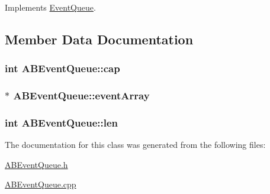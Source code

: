 Implements \hyperlink{class_event_queue_a4f49434cc8ca60030f2b5737399527e2}{Event\+Queue}.



\subsection{Member Data Documentation}
\subsubsection[{\texorpdfstring{cap}{cap}}]{\setlength{\rightskip}{0pt plus 5cm}int A\+B\+Event\+Queue\+::cap\hspace{0.3cm}{\ttfamily [private]}}\hypertarget{class_a_b_event_queue_a3f8d4bf9c3dad9b88a9f99220b567ed6}{}\label{class_a_b_event_queue_a3f8d4bf9c3dad9b88a9f99220b567ed6}
\subsubsection[{\texorpdfstring{event\+Array}{eventArray}}]{$\ast$ A\+B\+Event\+Queue\+::event\+Array\hspace{0.3cm}{\ttfamily [private]}}\hypertarget{class_a_b_event_queue_acb0bc62d6a21b4633ba50ae83fd4d79e}{}\label{class_a_b_event_queue_acb0bc62d6a21b4633ba50ae83fd4d79e}
\subsubsection[{\texorpdfstring{len}{len}}]{\setlength{\rightskip}{0pt plus 5cm}int A\+B\+Event\+Queue\+::len\hspace{0.3cm}{\ttfamily [private]}}\hypertarget{class_a_b_event_queue_a26f1044edfb22cd3438b6da3839f6087}{}\label{class_a_b_event_queue_a26f1044edfb22cd3438b6da3839f6087}


The documentation for this class was generated from the following files\+:\begin{DoxyCompactItemize}
\item 
\hyperlink{_a_b_event_queue_8h}{A\+B\+Event\+Queue.\+h}\item 
\hyperlink{_a_b_event_queue_8cpp}{A\+B\+Event\+Queue.\+cpp}\end{DoxyCompactItemize}
